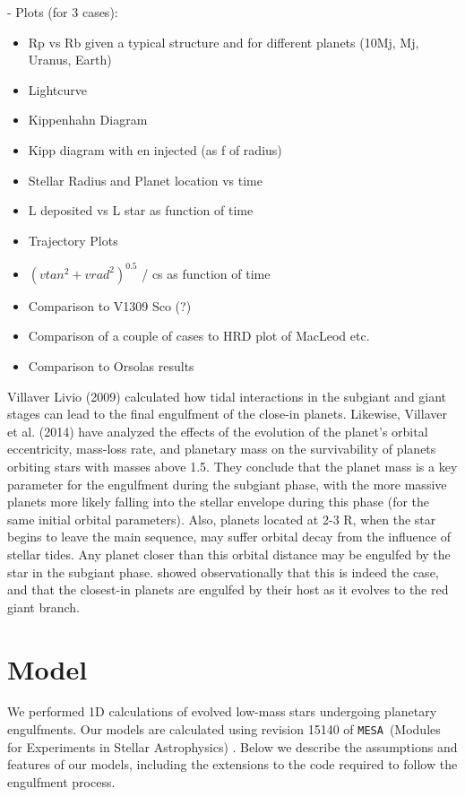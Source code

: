 \documentclass[twocolumn]{aastex62}
\newcommand{\code}[1]{\texttt{#1}}
\newcommand{\mesa}{\code{MESA}}
\newcommand{\MESA}{\mesa}
\begin{document}
- Plots (for 3 cases): 


\begin{itemize}
    \item Rp vs Rb given a typical structure and for different planets
(10Mj, Mj, Uranus, Earth) 
    \item Lightcurve
    \item Kippenhahn Diagram
    \item Kipp diagram with en injected (as f of radius)
    \item Stellar Radius and Planet location vs time
    \item L deposited vs L star as function of time
    \item Trajectory Plots
    \item $(vtan^2+vrad^2)^{0.5}$ / cs as function of time
    \item Comparison to V1309 Sco (?)
    \item Comparison of a couple of cases to HRD plot of MacLeod etc.
    \item Comparison to Orsolas results
\end{itemize}


Villaver  Livio (2009) calculated how tidal interactions in the subgiant and giant stages can lead to the final engulfment of the close-in planets. Likewise, Villaver et al. (2014) have analyzed the effects of the evolution of the planet’s orbital eccentricity, mass-loss rate, and planetary mass on the survivability of planets orbiting stars with masses above 1.5. They
conclude that the planet mass is a key parameter for the engulfment during the subgiant phase, with the more massive planets more likely falling into the stellar envelope during this phase (for
the same initial orbital parameters). Also, planets located at 2-3
R, when the star begins to leave the main sequence, may suffer orbital decay from the influence of stellar tides. Any planet closer than this orbital distance may be engulfed by the star in the subgiant phase. \citet{Lillo-Box:2016} showed observationally that this is indeed the case, and that  the closest-in planets are 
engulfed by their host as it evolves to the red giant branch.  

\section{Model}
We performed 1D calculations of evolved low-mass stars undergoing planetary engulfments. Our models are calculated
using revision 15140 of \MESA\ (Modules for Experiments in Stellar
Astrophysics) \citep{Paxton:2011,Paxton:2013,Paxton:2015,Paxton:2018,Paxton:2019}. Below we describe the assumptions and features of our models, including the extensions to the code required to follow the engulfment process. 
\end{document}
